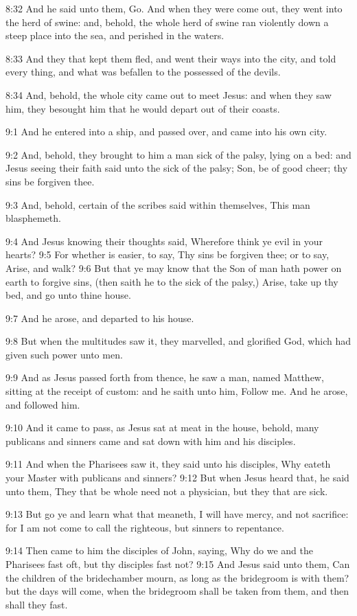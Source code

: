 8:32 And he said unto them, Go. And when they were come out, they went
into the herd of swine: and, behold, the whole herd of swine ran
violently down a steep place into the sea, and perished in the waters.

8:33 And they that kept them fled, and went their ways into the city,
and told every thing, and what was befallen to the possessed of the
devils.

8:34 And, behold, the whole city came out to meet Jesus: and when they
saw him, they besought him that he would depart out of their coasts.

9:1 And he entered into a ship, and passed over, and came into his own
city.

9:2 And, behold, they brought to him a man sick of the palsy, lying on
a bed: and Jesus seeing their faith said unto the sick of the palsy;
Son, be of good cheer; thy sins be forgiven thee.

9:3 And, behold, certain of the scribes said within themselves, This
man blasphemeth.

9:4 And Jesus knowing their thoughts said, Wherefore think ye evil in
your hearts?  9:5 For whether is easier, to say, Thy sins be forgiven
thee; or to say, Arise, and walk?  9:6 But that ye may know that the
Son of man hath power on earth to forgive sins, (then saith he to the
sick of the palsy,) Arise, take up thy bed, and go unto thine house.

9:7 And he arose, and departed to his house.

9:8 But when the multitudes saw it, they marvelled, and glorified God,
which had given such power unto men.

9:9 And as Jesus passed forth from thence, he saw a man, named
Matthew, sitting at the receipt of custom: and he saith unto him,
Follow me. And he arose, and followed him.

9:10 And it came to pass, as Jesus sat at meat in the house, behold,
many publicans and sinners came and sat down with him and his
disciples.

9:11 And when the Pharisees saw it, they said unto his disciples, Why
eateth your Master with publicans and sinners?  9:12 But when Jesus
heard that, he said unto them, They that be whole need not a
physician, but they that are sick.

9:13 But go ye and learn what that meaneth, I will have mercy, and not
sacrifice: for I am not come to call the righteous, but sinners to
repentance.

9:14 Then came to him the disciples of John, saying, Why do we and the
Pharisees fast oft, but thy disciples fast not?  9:15 And Jesus said
unto them, Can the children of the bridechamber mourn, as long as the
bridegroom is with them? but the days will come, when the bridegroom
shall be taken from them, and then shall they fast.

